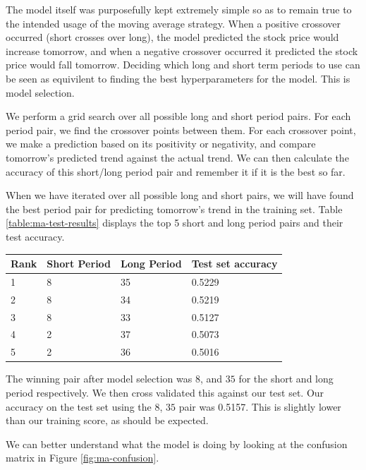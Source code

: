 \documentclass{report}
\begin{document}
The model itself was purposefully kept extremely simple so as to remain true to the intended usage of the moving average strategy. When a positive crossover occurred (short crosses over long), the model predicted the stock price would increase tomorrow, and when a negative crossover occurred it predicted the stock price would fall tomorrow. Deciding which long and short term periods to use can be seen as equivilent to finding the best hyperparameters for the model. This is model selection.

We perform a grid search over all possible long and short period pairs. For each period pair, we find the crossover points between them. For each crossover point, we make a prediction based on its positivity or negativity, and compare tomorrow's predicted trend against the actual trend. We can then calculate the accuracy of this short/long period pair and remember it if it is the best so far.

When we have iterated over all possible long and short pairs, we will have found the best period pair for predicting tomorrow's trend in the training set. Table \ref{table:ma-test-results} displays the top 5 short and long period pairs and their test accuracy.


\begin{center}
    \begin{tabular}{l | l | l | l}
    Rank & Short Period & Long Period & Test set accuracy \\ \hline
    1 & 8 & 35 & 0.5229 \\ \hline
    2 & 8 & 34 & 0.5219 \\ \hline
    3 & 8 & 33 & 0.5127 \\ \hline
    4 & 2 & 37 & 0.5073 \\ \hline
    5 & 2 & 36 & 0.5016 
    \label{table:ma-test-results}
    \end{tabular}
\end{center}

The winning pair after model selection was $8$, and $35$ for the short and long period respectively. We then cross validated this against our test set. Our accuracy on the test set using the $8$, $35$ pair was 0.5157. This is slightly lower than our training score, as should be expected.

We can better understand what the model is doing by looking at the confusion matrix in Figure \ref{fig:ma-confusion}.
\end{document}
